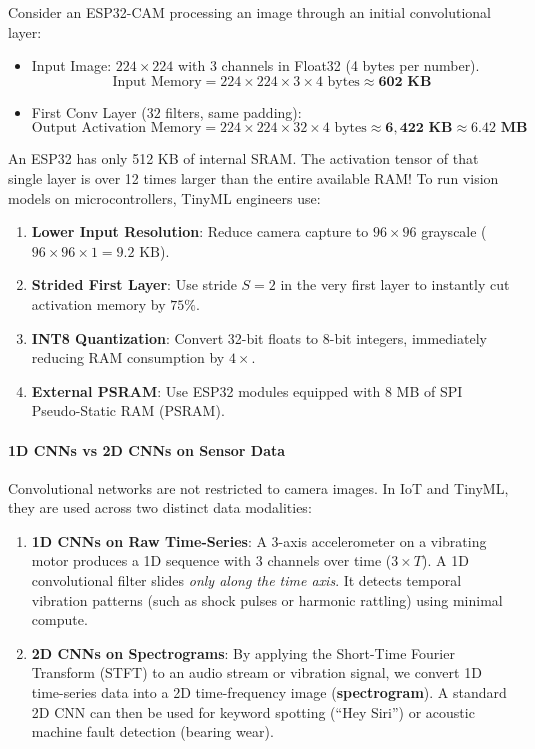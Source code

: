 Consider an ESP32-CAM processing an image through an initial convolutional layer:
\begin{itemize}
    \item Input Image: $224 \times 224$ with 3 channels in Float32 (4 bytes per number).
    \begin{equation*}
    \text{Input Memory} = 224 \times 224 \times 3 \times 4 \text{ bytes} \approx \mathbf{602\text{ KB}}
    \end{equation*}
    \item First Conv Layer ($32$ filters, same padding):
    \begin{equation*}
    \text{Output Activation Memory} = 224 \times 224 \times 32 \times 4 \text{ bytes} \approx \mathbf{6{,}422\text{ KB}} \approx \mathbf{6.42\text{ MB}}
    \end{equation*}
\end{itemize}
An ESP32 has only 512 KB of internal SRAM. The activation tensor of that single layer is over 12 times larger than the entire available RAM! To run vision models on microcontrollers, TinyML engineers use:
\begin{enumerate}
    \item \textbf{Lower Input Resolution}: Reduce camera capture to $96 \times 96$ grayscale ($96 \times 96 \times 1 = 9.2\text{ KB}$).
    \item \textbf{Strided First Layer}: Use stride $S=2$ in the very first layer to instantly cut activation memory by $75\%$.
    \item \textbf{INT8 Quantization}: Convert 32-bit floats to 8-bit integers, immediately reducing RAM consumption by $4\times$.
    \item \textbf{External PSRAM}: Use ESP32 modules equipped with 8 MB of SPI Pseudo-Static RAM (PSRAM).
\end{enumerate}

\paragraph{1D CNNs vs 2D CNNs on Sensor Data}
Convolutional networks are not restricted to camera images. In IoT and TinyML, they are used across two distinct data modalities:
\begin{enumerate}
    \item \textbf{1D CNNs on Raw Time-Series}: A 3-axis accelerometer on a vibrating motor produces a 1D sequence with 3 channels over time ($3 \times T$). A 1D convolutional filter slides \emph{only along the time axis}. It detects temporal vibration patterns (such as shock pulses or harmonic rattling) using minimal compute.
    \item \textbf{2D CNNs on Spectrograms}: By applying the Short-Time Fourier Transform (STFT) to an audio stream or vibration signal, we convert 1D time-series data into a 2D time-frequency image (\textbf{spectrogram}). A standard 2D CNN can then be used for keyword spotting (``Hey Siri'') or acoustic machine fault detection (bearing wear).
\end{enumerate}

